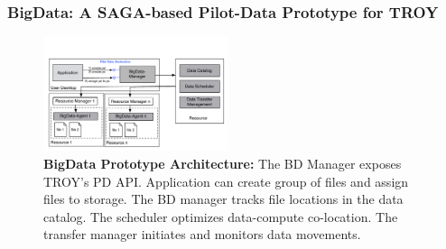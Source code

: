 \subsubsection*{BigData: A SAGA-based Pilot-Data Prototype for TROY}
\label{sec:bigdata}

\begin{figure}[t]
	\upp\upp\upp\upp
    \centering
    \includegraphics[width=0.48\textwidth]{figures/pilot-data-manager.pdf}
    \caption{\textbf{BigData Prototype Architecture:} The BD Manager
      exposes TROY's PD API. Application can create group of files and
      assign files to storage. The BD manager tracks file locations in
      the data catalog. The scheduler optimizes data-compute
      co-location.  The transfer manager initiates and monitors data
      movements. \up\up}
    \label{fig:pilot-data-architecture}
\end{figure}


